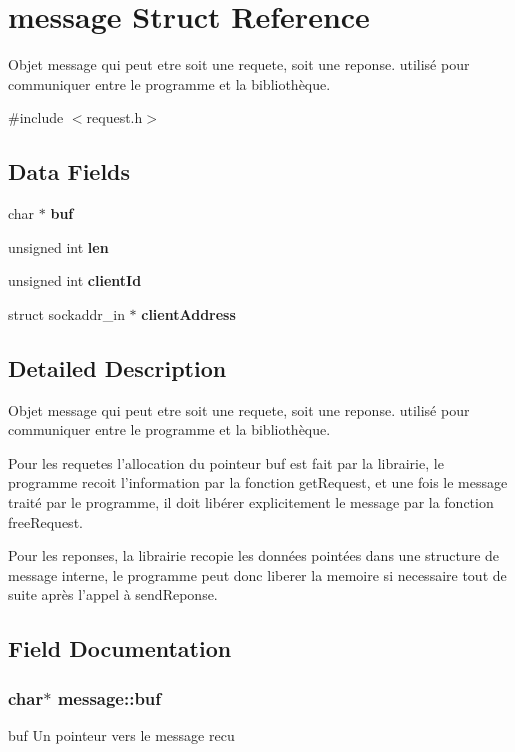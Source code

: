 \section{message Struct Reference}
\label{structmessage}


Objet message qui peut etre soit une requete, soit une reponse. utilisé pour communiquer entre le programme et la bibliothèque.  




{\ttfamily \#include $<$request.\+h$>$}

\subsection*{Data Fields}
\begin{DoxyCompactItemize}
\item 
char $\ast$ {\bf buf}
\item 
unsigned int {\bf len}
\item 
unsigned int {\bf client\+Id}
\item 
struct sockaddr\+\_\+in $\ast$ {\bf client\+Address}
\end{DoxyCompactItemize}


\subsection{Detailed Description}
Objet message qui peut etre soit une requete, soit une reponse. utilisé pour communiquer entre le programme et la bibliothèque. 

Pour les requetes l'allocation du pointeur buf est fait par la librairie, le programme recoit l'information par la fonction get\+Request, et une fois le message traité par le programme, il doit libérer explicitement le message par la fonction free\+Request.

Pour les reponses, la librairie recopie les données pointées dans une structure de message interne, le programme peut donc liberer la memoire si necessaire tout de suite après l'appel à send\+Reponse. 

\subsection{Field Documentation}
\subsubsection[{buf}]{\setlength{\rightskip}{0pt plus 5cm}char$\ast$ message\+::buf}\label{structmessage_ae39c7ead60245755a62c4aefcb0ea53e}
buf Un pointeur vers le message recu 
